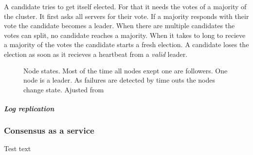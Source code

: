 A candidate tries to get itself elected. For that it needs the votes of a majority of the cluster. It first asks all servers for their vote. If a majority responds with their vote the candidate becomes a leader. When there are multiple candidates the votes can split, no candidate reaches a majority. When it takes to long to recieve a majority of the votes the candidate starts a fresh election. A candidate loses the election as soon as it recieves a heartbeat from a \emph{valid} leader.

\begin{figure}[htbp]
	\centering
	
	\caption{Node states. Most of the time all nodes exept one are followers. One node is a leader. As failures are detected by time outs the nodes change state. Ajusted from \cite{raft}}
	\label{fig:raft_states}
\end{figure}


\subparagraph{Log replication}

\subsubsection*{Consensus as a service}
Test text
